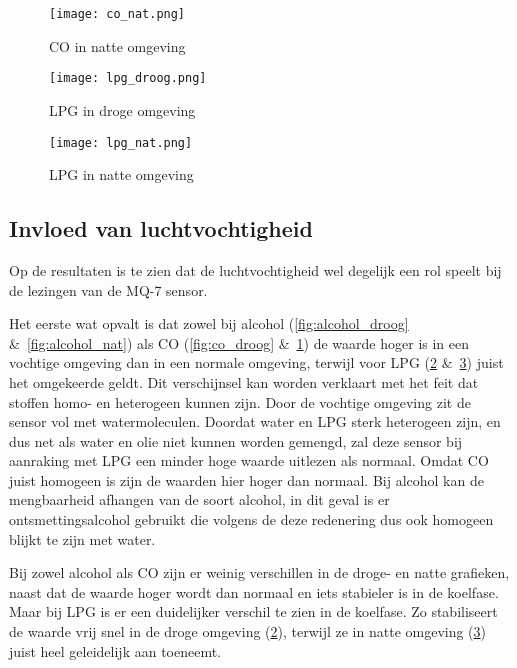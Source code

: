 \begin{figure}[h!]
    \texttt{[image: co\_nat.png]}
    \caption[CO in natte omgeving]{CO in natte omgeving}
    \label{fig:co_nat}
\end{figure}

\begin{figure}[h!]
    \texttt{[image: lpg\_droog.png]}
    \caption[LPG in droge omgeving]{LPG in droge omgeving}
    \label{fig:lpg_droog}
\end{figure}

\begin{figure}[h!]
    \texttt{[image: lpg\_nat.png]}
    \caption[LPG in natte omgeving]{LPG in natte omgeving}
    \label{fig:lpg_nat}
\end{figure}


\clearpage
\subsection{Invloed van luchtvochtigheid}
\label{subsec:invloed_hum}

Op de resultaten is te zien dat de luchtvochtigheid wel degelijk een rol speelt bij de lezingen van de MQ-7 sensor. 

Het eerste wat opvalt is dat zowel bij alcohol (\ref{fig:alcohol_droog} \&~\ref{fig:alcohol_nat}) als CO (\ref{fig:co_droog} \&~\ref{fig:co_nat}) de waarde hoger is in een vochtige omgeving dan in een normale omgeving, terwijl voor LPG (\ref{fig:lpg_droog} \&~\ref{fig:lpg_nat}) juist het omgekeerde geldt. Dit verschijnsel kan worden verklaart met het feit dat stoffen homo- en heterogeen kunnen zijn.
Door de vochtige omgeving zit de sensor vol met watermoleculen. Doordat water en LPG sterk heterogeen zijn, en dus net als water en olie niet kunnen worden gemengd, zal deze sensor bij aanraking met LPG een minder hoge waarde uitlezen als normaal. Omdat CO juist homogeen is zijn de waarden hier hoger dan normaal. Bij alcohol kan de mengbaarheid afhangen van de soort alcohol, in dit geval is er ontsmettingsalcohol gebruikt die volgens de deze redenering dus ook homogeen blijkt te zijn met water.

Bij zowel alcohol als CO zijn er weinig verschillen in de droge- en natte grafieken, naast dat de waarde hoger wordt dan normaal en iets stabieler is in de koelfase. Maar bij LPG is er een duidelijker verschil te zien in de koelfase. Zo stabiliseert de waarde vrij snel in de droge omgeving (\ref{fig:lpg_droog}), terwijl ze in natte omgeving (\ref{fig:lpg_nat}) juist heel geleidelijk aan toeneemt.



